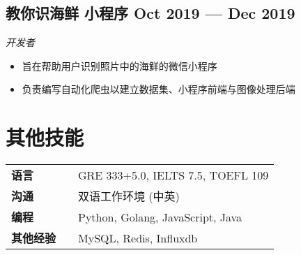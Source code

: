 \documentclass[a4,12pt]{article}
\newcommand{\subtext}[1]{
#1\par\vspace{-0.3cm}}
\newenvironment{zitemize}{
\begin{itemize}\itemsep0pt \parskip0pt \parsep1pt}
{\end{itemize}\vspace{-0.5cm}}
\newcommand{\hskills}[1]{
\textbf{\bfseries #1} }
\begin{document}
\subsection*{教你识海鲜 小程序 \hfill \textbf{Oct 2019 --- Dec 2019}}
\subtext{\textit{开发者}}
\begin{zitemize}
    \item 旨在帮助用户识别照片中的海鲜的微信小程序 
    \item 负责编写自动化爬虫以建立数据集、小程序前端与图像处理后端
\end{zitemize}



\section{\textbf{其他技能}}
\begin{tabular}{p{11em} p{1em} p{43em}}
\hskills{语言} & & GRE 333+5.0, IELTS 7.5, TOEFL 109 \\
\hskills{沟通} & & 双语工作环境 (中英)  \\
\hskills{编程} &  & Python, Golang, JavaScript, Java \\
\hskills{其他经验} & & MySQL, Redis, Influxdb
\end{tabular}
\vspace{-0.2cm}








\end{document}
